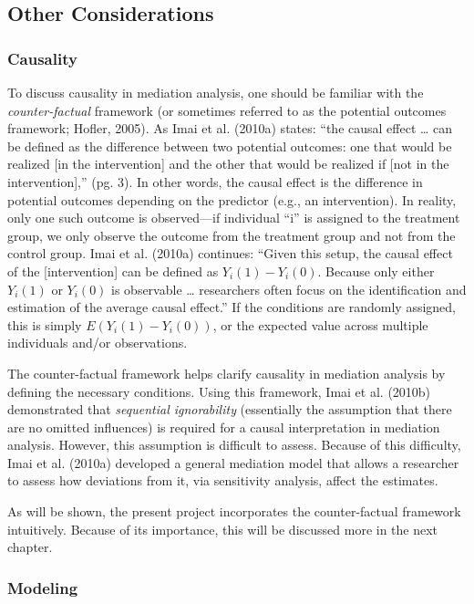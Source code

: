 \documentclass[]{DissertateUSU}
\begin{document}
\subsection{Other Considerations}\label{other-considerations}

\subsubsection{Causality}\label{causality}

To discuss causality in mediation analysis, one should be familiar with
the \emph{counter-factual} framework (or sometimes referred to as the
potential outcomes framework; Hofler, 2005). As Imai et al. (2010a)
states: ``the causal effect \ldots{} can be defined as the difference
between two potential outcomes: one that would be realized {[}in the
intervention{]} and the other that would be realized if {[}not in the
intervention{]},'' (pg. 3). In other words, the causal effect is the
difference in potential outcomes depending on the predictor (e.g., an
intervention). In reality, only one such outcome is observed---if
individual ``i'' is assigned to the treatment group, we only observe the
outcome from the treatment group and not from the control group. Imai et
al. (2010a) continues: ``Given this setup, the causal effect of the
{[}intervention{]} can be defined as \(Y_i(1) - Y_i(0)\). Because only
either \(Y_i(1)\) or \(Y_i(0)\) is observable \ldots{} researchers often
focus on the identification and estimation of the average causal
effect.'' If the conditions are randomly assigned, this is simply
\(E(Y_i(1) - Y_i(0))\), or the expected value across multiple
individuals and/or observations.

The counter-factual framework helps clarify causality in mediation
analysis by defining the necessary conditions. Using this framework,
Imai et al. (2010b) demonstrated that \emph{sequential ignorability}
(essentially the assumption that there are no omitted influences) is
required for a causal interpretation in mediation analysis. However,
this assumption is difficult to assess. Because of this difficulty, Imai
et al. (2010a) developed a general mediation model that allows a
researcher to assess how deviations from it, via sensitivity analysis,
affect the estimates.

As will be shown, the present project incorporates the counter-factual
framework intuitively. Because of its importance, this will be discussed
more in the next chapter.

\subsubsection{Modeling}\label{modeling}
\end{document}
